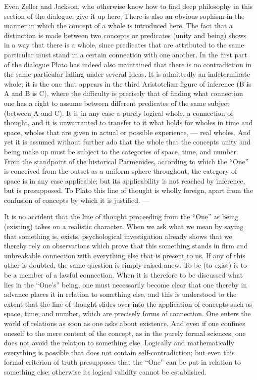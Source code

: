 \documentclass[12pt,a4paper,openany]{book}
\newcommand{\opage}[1]{\marginnote{\footnotesize\textit{[#1]}}}
\begin{document}
Even Zeller and Jackson, who otherwise know how to find deep
philosophy in this section of the dialogue, give it up here.
There is also an obvious sophism in the manner in which
the concept of a whole is introduced here.  The fact that a distinction is made between
two concepts or predicates (unity and being) shows
in a way that there is a whole, since predicates that
\setcounter{footnote}{0}%
\opage{34}are attributed to the same particular must stand in a certain connection
with one another.  In the first part of the dialogue Plato has indeed also
maintained that there is no contradiction in the same particular
falling under several Ideas.  It is admittedly an indeterminate
whole; it is the one that appears in the third Aristotelian
figure of inference (B is A and B is C), where the difficulty
is precisely that of finding what connection one
has a right to assume between different predicates of the
same subject (between A and C).  It is in any case
a purely logical whole, a connection of thought, and it is
unwarranted to transfer to it what holds for wholes
in time and space, wholes that are given in actual
or possible experience, --- real wholes.  And yet it is
assumed without further ado that the whole that the concepts unity and
being make up must be subject to the categories of space, time, and number.
From the standpoint of the historical Parmenides, according to which
the ``One'' is conceived from the outset as a uniform
sphere throughout, the category of space is in any case applicable;
but its applicability is not reached by inference, but is
presupposed.  To Plato this line of thought is wholly foreign,
apart from the confusion of concepts by which it is justified. ---

It is no accident that the line of thought proceeding from the ``One''
as being (existing) takes on a realistic character.
When we ask what we mean by saying that something is, exists,
psychological investigation already shows that we thereby
rely on observations which prove that this something stands
in firm and unbreakable connection with everything else that is present
to us.  If any of this other is doubted, the
same question is simply raised anew.  To be (to exist) is
to be a member of a lawful connection.  When it
is therefore to be discussed what lies in the ``One's'' being,
one must necessarily become clear that one thereby in advance
\setcounter{footnote}{0}%
\opage{35}places it in relation to something else, and this is understood
to the extent that the line of thought slides over into the application of
concepts such as space, time, and number, which are precisely forms of
connection.  One enters the world of relations
as soon as one asks about existence.  And even if one confines
oneself to the mere content of the concept, as in the purely formal
sciences, one does not avoid the relation to something
else.  Logically and mathematically everything is possible that does not
contain self-contradiction; but even this formal criterion of truth
presupposes that the ``One'' can be put in relation
to something else; otherwise its logical validity
cannot be established.
\end{document}
